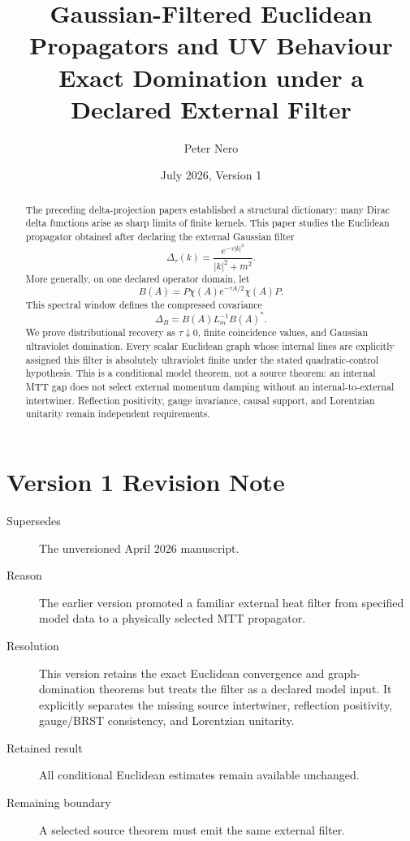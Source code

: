 \documentclass[11pt]{article}
\title{Gaussian-Filtered Euclidean Propagators and UV Behaviour\\
\large Exact Domination under a Declared External Filter}
\author{Peter Nero}
\date{July 2026, Version 1}
\begin{document}
\maketitle

\begin{abstract}
The preceding delta-projection papers established a structural dictionary: many Dirac delta
functions arise as sharp limits of finite kernels.  This paper studies the Euclidean propagator
obtained after declaring the external Gaussian filter
\[
        \Delta_\tau(k)=\frac{e^{-\tau |k|^2}}{|k|^2+m^2}.
\]
More generally, on one declared operator domain, let
\[
B(A)=P\chi(A)e^{-\tau A/2}\chi(A)P .
\]
This spectral window defines the compressed covariance
\[
        \Delta_B = B(A)L_m^{-1}B(A)^\ast .
\]
We prove distributional recovery as \(\tau\downarrow0\), finite coincidence values, and
Gaussian ultraviolet domination.  Every scalar Euclidean graph whose internal lines are
explicitly assigned this filter is absolutely ultraviolet finite under the stated
quadratic-control hypothesis.  This is a conditional model theorem, not a source theorem:
an internal MTT gap does not select external momentum damping without an
internal-to-external intertwiner.  Reflection positivity, gauge invariance, causal support,
and Lorentzian unitarity remain independent requirements.
\end{abstract}

\section*{Version 1 Revision Note}
\begin{description}
\item[Supersedes] The unversioned April 2026 manuscript.
\item[Reason] The earlier version promoted a familiar external heat filter from specified
model data to a physically selected MTT propagator.
\item[Resolution] This version retains the exact Euclidean convergence and graph-domination
theorems but treats the filter as a declared model input.  It explicitly separates the missing
source intertwiner, reflection positivity, gauge/BRST consistency, and Lorentzian unitarity.
\item[Retained result] All conditional Euclidean estimates remain available unchanged.
\item[Remaining boundary] A selected source theorem must emit the same external filter.
\end{description}
\end{document}
